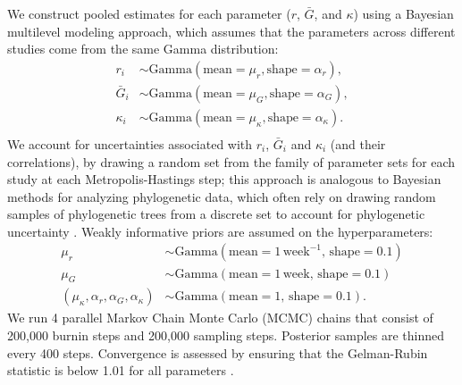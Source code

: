 \documentclass[12pt]{article}
\begin{document}
We construct pooled estimates for each parameter ($r$, $\bar G$, and $\kappa$) using a Bayesian multilevel modeling approach, which assumes that the parameters across different studies come from the same Gamma distribution:
\begin{equation}
\begin{aligned}
r_i &\sim \mathrm{Gamma}(\mathrm{mean}=\mu_r, \mathrm{shape}=\alpha_r),\\
\bar{G}_i &\sim \mathrm{Gamma}(\mathrm{mean}=\mu_G, \mathrm{shape}=\alpha_G),\\
\kappa_i &\sim \mathrm{Gamma}(\mathrm{mean}=\mu_\kappa, \mathrm{shape}=\alpha_\kappa).\\
\end{aligned}
\end{equation}
We account for uncertainties associated with $r_i$, $\bar G_i$ and $\kappa_i$ (and their correlations), by drawing a random set from the family of parameter sets for each study at each Metropolis-Hastings step;
this approach is analogous to Bayesian methods for analyzing phylogenetic data, which often rely on drawing random samples of phylogenetic trees from a discrete set to account for phylogenetic uncertainty \citep{pagel2004bayesian,bedford2014integrating}.
Weakly informative priors are assumed on the hyperparameters:
\begin{equation}
\begin{aligned}
\mu_r &\sim \mathrm{Gamma}(\mathrm{mean}=1\,\mathrm{week}^{-1},\,\mathrm{shape}=0.1)\\
\mu_G &\sim \mathrm{Gamma}(\mathrm{mean}=1\,\mathrm{week},\,\mathrm{shape}=0.1)\\
(\mu_\kappa, \alpha_r, \alpha_G, \alpha_\kappa) &\sim \mathrm{Gamma}(\mathrm{mean}=1,\,\mathrm{shape}=0.1).
\end{aligned}
\end{equation}
We run 4 parallel Markov Chain Monte Carlo (MCMC) chains that consist of 200,000 burnin steps and 200,000 sampling steps.
Posterior samples are thinned every 400 steps.
Convergence is assessed by ensuring that the Gelman-Rubin statistic is below 1.01 for all parameters \citep{gelman1992inference}.


\pagebreak


\end{document}
